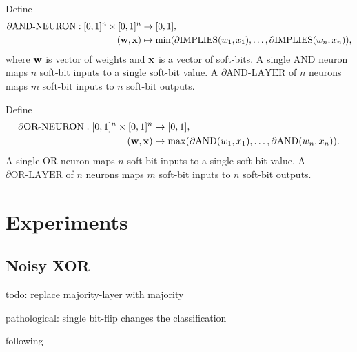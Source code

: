 \documentclass{article} %
\begin{document}

Define
\begin{equation*}
\begin{aligned}
\partial\text{AND-NEURON}: [0,1]^{n} \times [0,1]^{n} &\to [0,1], \\
({\bf w}, {\bf x}) &\mapsto \min(\partial\text{IMPLIES}(w_{1}, x_{1}), \dots, \partial\text{IMPLIES}(w_{n}, x_{n}))\text{,}
\end{aligned}
\end{equation*}
where ${\bf w}$ is vector of weights and ${\bf x}$ is a vector of soft-bits. A single AND neuron maps $n$ soft-bit inputs to a single soft-bit value. A $\partial\text{AND-LAYER}$ of $n$ neurons maps $m$ soft-bit inputs to $n$ soft-bit outputs.

Define
\begin{equation*}
\begin{aligned}
\partial\text{OR-NEURON}: [0,1]^{n} \times [0,1]^{n} &\to [0,1], \\
({\bf w}, {\bf x}) &\mapsto \max(\partial\text{AND}(w_{1}, x_{1}), \dots, \partial\text{AND}(w_{n}, x_{n}))\text{.}
\end{aligned}
\end{equation*}
A single OR neuron maps $n$ soft-bit inputs to a single soft-bit value. A $\partial\text{OR-LAYER}$ of $n$ neurons maps $m$ soft-bit inputs to $n$ soft-bit outputs.


\section{Experiments}

\subsection{Noisy XOR}

todo: replace majority-layer with majority

pathological: single bit-flip changes the classification

following \cite{granmo18}
 
\end{document}
